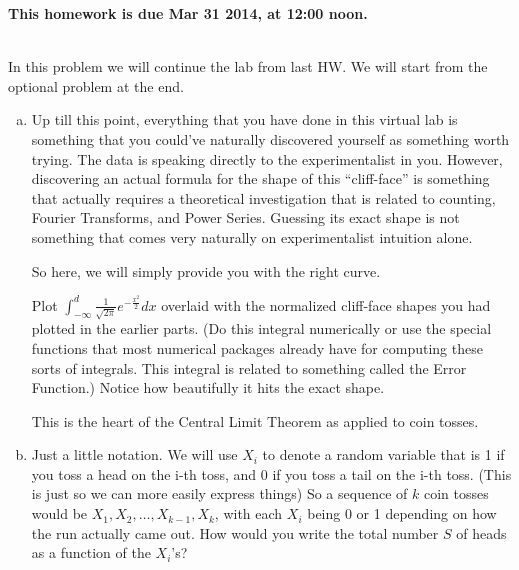 \documentclass[]{article}
\begin{document}
\maketitle
{}
\vspace{0.5em}
{\Large{\textbf{This homework is due Mar 31 2014, at 12:00 noon.}}}

\begin{qunlist}
  
\\    
In this problem we will continue the lab from last HW. We will start from the optional problem at the end.
\begin{enumerate}[a)]
\qpart 
\item  Up till this point, everything that
  you have done in this virtual lab is something that you could've
  naturally discovered yourself as something worth trying. The data is
  speaking directly to the experimentalist in you. However,
  discovering an actual formula for the shape of this ``cliff-face'' is
  something that actually requires a theoretical investigation that is
  related to counting, Fourier Transforms, and Power Series. Guessing
  its exact shape is not something that comes very naturally on
  experimentalist intuition alone.

  So here, we will simply provide you with the right curve.

  Plot $\int_{-\infty}^d\frac{1}{\sqrt{2\pi}} e^{-\frac{x^2}{2}}dx$
  overlaid with the normalized cliff-face shapes you had plotted in
  the earlier parts. (Do this integral numerically or use the special
  functions that most numerical packages already have for computing
  these sorts of integrals. This integral is related to something
  called the Error Function.) Notice how beautifully it hits the exact
  shape. 

  This is the heart of the Central Limit Theorem as applied to coin
  tosses.
\qpart
\item Just a little notation. We will use $X_i$ to denote a random
  variable that is 1 if you toss a head on the i-th toss, and 0 if you toss a
  tail on the i-th toss. (This is just so we can more easily express 
  things) So a sequence of $k$ coin tosses would be $X_1, X_2, \ldots,
  X_{k-1}, X_k$, with each $X_i$ being 0 or 1 depending on how the run
  actually came out. How would you write the total number $S$ of heads
  as a function of the $X_i$'s? 


\end{enumerate}
\end{qunlist}
\end{document}
